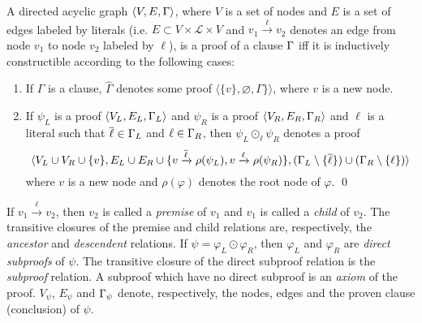 \documentclass{llncs}
\begin{document}
\newcommand{\axiom}[1]{\hat{#1}}
\newcommand{\n}{v}
\newcommand{\raiz}[1]{\rho(#1)}

\begin{definition}[Proof] 
\label{def:proof}
A directed acyclic graph $\langle V, E, \Gamma \rangle$, where $V$ is a set of nodes and $E$ is a
set of edges labeled by literals (i.e. $E \subset V \times \mathcal{L} \times V$ and $\n_1
\xrightarrow{\ell} \n_2$ denotes an edge from node $\n_1$ to node $\n_2$ labeled by $\ell$), is a
proof of a clause $\Gamma$ iff it is inductively constructible according to the following cases:
%
\begin{enumerate}
  \item If $\Gamma$ is a clause, $\axiom{\Gamma}$ denotes some proof $\langle \{ \n \}, \varnothing,
    \Gamma \} \rangle$, where $\n$ is a new node.
  \item If $\psi_L$ is a proof $\langle V_L, E_L, \Gamma_L \rangle$ and
    $\psi_R$ is a proof $\langle V_R, E_R, \Gamma_R \rangle$ and $\ell$ is a literal such that
    $\overline{\ell} \in \Gamma_L$ and $\ell \in \Gamma_R$, then
    $\psi_L \odot_\ell \psi_R$ denotes a proof 
    $$\langle 
    V_L \cup V_R \cup \{\n \},
    E_L \cup E_R \cup \{\n \xrightarrow{\dual{\ell}} \raiz{\psi_L}, \n \xrightarrow{\ell} \raiz{\psi_R}\}, 
    (\clause_L \setminus \{ \dual{\ell} \}) \cup (\clause_R \setminus \{ \ell \})
    \rangle$$
     where $\n$ is a new node and $\raiz{\varphi}$ denotes the root node of $\varphi$.
  \qed
\end{enumerate}
\end{definition}


\newcommand{\Vertices}[1]{V_{#1}}
\newcommand{\Edges}[1]{E_{#1}}
\newcommand{\Conclusion}[1]{\clause_{#1}}

\noindent
If $\n_1 \xrightarrow{\ell} \n_2$, then $\n_2$ is called a \emph{premise} of $\n_1$ and $\n_1$ is
called a \emph{child} of $\n_2$. The transitive closures of the premise and child relations are,
respectively, the \emph{ancestor} and \emph{descendent} relations. If $\psi = \varphi_L \odot
\varphi_R$, then $\varphi_L$ and $\varphi_R$ are \emph{direct subproofs} of $\psi$. The transitive
closure of the direct subproof relation is the \emph{subproof} relation. A subproof which have no
direct subproof is an \emph{axiom} of the proof.
%
%
$\Vertices{\psi}$, $\Edges{\psi}$ and $\Conclusion{\psi}$
denote, respectively, the nodes, edges and the proven clause (conclusion) of $\psi$.
\end{document}
